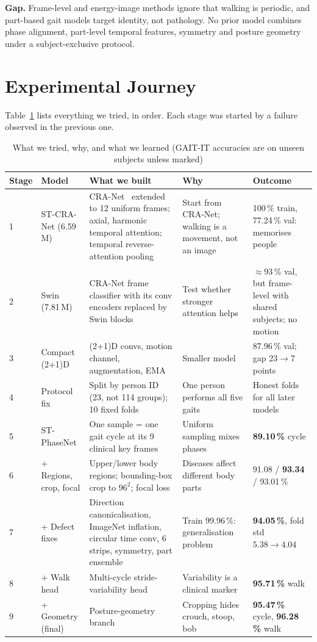 \documentclass[conference]{IEEEtran}
\begin{document}
\textbf{Gap.} Frame-level and energy-image methods ignore that walking is
periodic, and part-based gait models target identity, not pathology. No prior
model combines phase alignment, part-level temporal features, symmetry and
posture geometry under a subject-exclusive protocol.

\section{Experimental Journey}
Table~\ref{tab:journey} lists everything we tried, in order. Each stage was
started by a failure observed in the previous one.

\begin{table}[!t]
\centering
\caption{What we tried, why, and what we learned (GAIT-IT accuracies are on unseen subjects unless marked)}
\label{tab:journey}
\footnotesize
\setlength{\tabcolsep}{3pt}
\begin{tabular}{@{}p{0.5cm}p{2.6cm}p{6.4cm}p{3.6cm}p{3.8cm}@{}}
\toprule
Stage & Model & What we built & Why & Outcome \\
\midrule
1 & ST-CRA-Net (6.59\,M) & CRA-Net~\cite{bodepu_cranet} extended to 12 uniform frames; axial, harmonic temporal attention; temporal reverse-attention pooling & Start from CRA-Net; walking is a movement, not an image & 100\,\% train, 77.24\,\% val: memorises people \\
2 & Swin (7.81\,M) & CRA-Net frame classifier with its conv encoders replaced by Swin blocks~\cite{liu2021swin} & Test whether stronger attention helps & $\approx$93\,\% val, but frame-level with shared subjects; no motion \\
3 & Compact (2+1)D & (2+1)D convs, motion channel, augmentation, EMA & Smaller model & 87.96\,\% val; gap 23$\rightarrow$7 points \\
4 & Protocol fix & Split by person ID (23, not 114 groups); 10 fixed folds & One person performs all five gaits & Honest folds for all later models \\
5 & ST-PhaseNet & One sample = one gait cycle at its 9 clinical key frames & Uniform sampling mixes phases & \textbf{89.10\,\%} cycle \\
6 & + Regions, crop, focal & Upper/lower body regions; bounding-box crop to $96^2$; focal loss & Diseases affect different body parts & 91.08 / \textbf{93.34} / 93.01\,\% \\
7 & + Defect fixes & Direction canonicalisation, ImageNet inflation, circular time conv, 6 strips, symmetry, part ensemble & Train 99.96\,\%: generalisation problem & \textbf{94.05\,\%}, fold std $5.38\rightarrow4.04$ \\
8 & + Walk head & Multi-cycle stride-variability head & Variability is a clinical marker & \textbf{95.71\,\%} walk \\
9 & + Geometry (final) & Posture-geometry branch & Cropping hides crouch, stoop, bob & \textbf{95.47\,\%} cycle, \textbf{96.28\,\%} walk \\
\bottomrule
\end{tabular}
\end{table}
\end{document}

